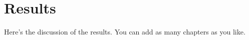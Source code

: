 \chapter[Results]{Results}\label{chap-results}

Here's the discussion of the results.  You can add as many chapters as you like.